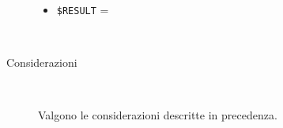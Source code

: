 \documentclass[../../SperimentazioniPratiche.tex]{subfiles}
\begin{document}
\begin{tcolorbox}[fonttitle=\bfseries, 
								adjusted title={\Large Prova 16B.1}, 
								breakable, 
								sharp corners=south,
								colback=white, 
								colframe=white!60!black]
\begin{description}[leftmargin=0.7cm,labelwidth=!]
\begin{description}
        					\item[\dispositivoC] \ \par
        					\begin{itemize}
        						\item \verb|$RESULT| = \ok
        					\end{itemize}
        					
        				\end{description}
        				
        			\tcbline
        			
        			\item[Analisi risultati] \ \par
        				\begin{description}
        					\item[Considerazioni] \ \par
        						Valgono le considerazioni descritte in precedenza.
        				\end{description}
        				
				\end{description}  
				
			\end{tcolorbox}
	
	
\end{document}
